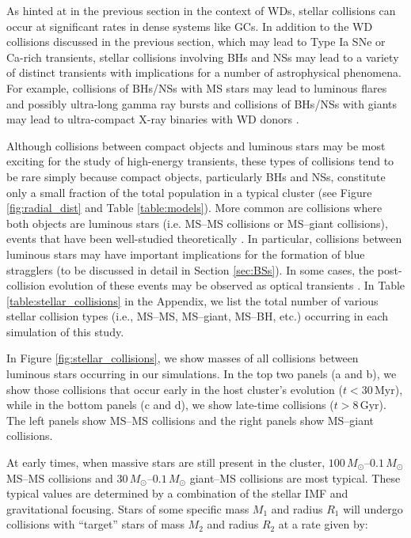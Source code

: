 \documentclass[twocolumn,tighten]{aastex63}
\begin{document}
As hinted at in the previous section in the context of WDs, stellar collisions can occur at significant rates in dense systems like GCs. In addition to the WD collisions discussed in the previous section, which may lead to Type Ia SNe or Ca-rich transients, stellar collisions involving BHs and NSs may lead to a variety of distinct transients with implications for a number of astrophysical phenomena. For example, collisions of BHs/NSs with MS stars may lead to luminous flares and possibly ultra-long gamma ray bursts \citep[e.g.,][]{Perets2016,Kremer2019c,Fragleipernkoc2019} and collisions of BHs/NSs with giants may lead to ultra-compact X-ray binaries with WD donors \citep[e.g.,][]{Ivanova2005,Ivanova2010,Kremer2019c}.

Although collisions between compact objects and luminous stars may be most exciting for the study of high-energy transients, these types of collisions tend to be rare simply because compact objects, particularly BHs and NSs, constitute only a small fraction of the total population in a typical cluster (see Figure \ref{fig:radial_dist} and Table \ref{table:models}). More common are collisions where both objects are luminous stars (i.e. MS--MS collisions or MS--giant collisions), events that have been well-studied theoretically \citep{HillsDay1976,Bacon1996,Lombardi2002,Fregeau2007,Leigh2011,Antognini2016}. In particular, collisions between luminous stars may have important implications for the formation of blue stragglers (to be discussed in detail in Section \ref{sec:BSs}). In some cases, the post-collision evolution of these events may be observed as optical transients \citep[e.g.][]{Tylenda2011,MacLeod2017,Metzger2017}. In Table \ref{table:stellar_collisions} in the Appendix, we list the total number of various stellar collision types (i.e., MS--MS, MS--giant, MS--BH, etc.) occurring in each simulation of this study.

In Figure \ref{fig:stellar_collisions}, we show masses of all collisions between luminous stars occurring in our simulations. In the top two panels (a and b), we show those collisions that occur early in the host cluster's evolution ($t<30\,$Myr), while in the bottom panels (c and d), we show late-time collisions ($t>8\,$Gyr). The left panels show MS--MS collisions and the right panels show MS--giant collisions.

At early times, when massive stars are still present in the cluster, $100\,M_{\odot}$--$0.1\,M_{\odot}$ MS--MS collisions and $30\,M_{\odot}$--$0.1\,M_{\odot}$ giant--MS collisions are most typical. These typical values are determined by a combination of the stellar IMF and gravitational focusing. Stars of some specific mass $M_1$ and radius $R_1$ will undergo collisions with ``target'' stars of mass $M_2$ and radius $R_2$ at a rate given by:
\end{document}

